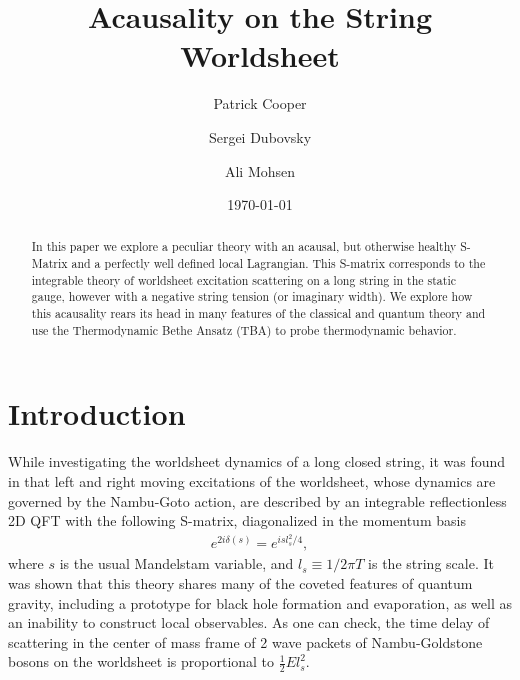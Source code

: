 \documentclass[%
 reprint,
 amsmath,amssymb,
 aps,
]{revtex4-1}
\begin{document}
\title{Acausality on the String Worldsheet}

\author{Patrick Cooper}
\author{Sergei Dubovsky}
\author{Ali Mohsen}

\date{\today}

\begin{abstract}
    In this paper we explore a peculiar theory with an acausal, but otherwise healthy S-Matrix and a
    perfectly well defined local Lagrangian.  This S-matrix corresponds to the integrable theory of
    worldsheet excitation scattering on a long string in the static gauge, however with a negative
    string tension (or imaginary width). We explore how this acausality rears its  head in many
    features of the classical and quantum theory and use the Thermodynamic Bethe Ansatz (TBA) to
    probe thermodynamic behavior.
\end{abstract}

\maketitle


\section{\label{sec:level1}Introduction}
While investigating the worldsheet dynamics of a long closed string, it was found in
\cite{Dubovsky:2012wk} that left and right moving excitations of the worldsheet, whose dynamics are
governed by the Nambu-Goto action, are described by an integrable reflectionless 2D QFT with the following
S-matrix, diagonalized in the momentum basis \begin{eqnarray} e^{2 i \delta(s)} = e^{i s l_s^2/4} ,
\nonumber \end{eqnarray} where $s$ is the usual Mandelstam variable, and $l_s \equiv 1/2 \pi T$ is
the string scale. It was shown that this theory shares many of the coveted features of quantum
gravity, including a prototype for black hole formation and evaporation, as well as an inability to
construct local observables. As one can check, the time delay of scattering in the center of mass
frame of 2 wave packets of Nambu-Goldstone bosons on the worldsheet is proportional to $\frac{1}{2}
E l_s^2$.
\end{document}
